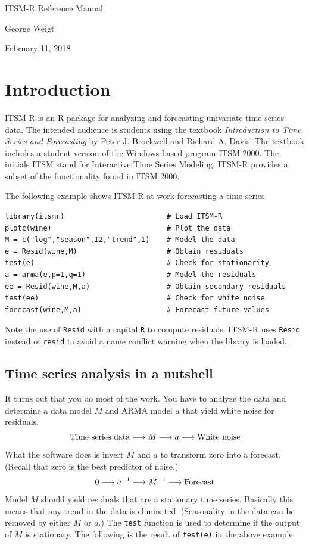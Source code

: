 \documentclass[12pt]{article}
\begin{document}
\begin{center}
{\LARGE ITSM-R Reference Manual}

George Weigt

February 11, 2018
\end{center}

\tableofcontents

\newpage

\section{Introduction}
ITSM-R is an R package for analyzing and forecasting univariate
time series data.
The intended audience is students using the textbook
{\it Introduction to Time Series and Forecasting}
by Peter J. Brockwell and Richard A. Davis.
The textbook includes a student version of the Windows-based program ITSM 2000.
The initials ITSM stand for Interactive Time Series Modeling.
ITSM-R provides a subset of the functionality found in ITSM 2000.

The following example shows ITSM-R at work forecasting a time series.

\begin{verbatim}
library(itsmr)                        # Load ITSM-R
plotc(wine)                           # Plot the data
M = c("log","season",12,"trend",1)    # Model the data
e = Resid(wine,M)                     # Obtain residuals
test(e)                               # Check for stationarity
a = arma(e,p=1,q=1)                   # Model the residuals
ee = Resid(wine,M,a)                  # Obtain secondary residuals
test(ee)                              # Check for white noise
forecast(wine,M,a)                    # Forecast future values
\end{verbatim}

Note the use of {\tt Resid} with a capital {\tt R} to compute residuals.
ITSM-R uses {\tt Resid} instead of {\tt resid} to avoid a name conflict
warning when the library is loaded.

\subsection{Time series analysis in a nutshell}
It turns out that you do most of the work.
You have to analyze the data and
determine a data model $M$ and ARMA model $a$
that yield white noise for residuals.
\[
\hbox{Time series data}
\longrightarrow M\longrightarrow a\longrightarrow
\hbox{White noise}
\]
What the software does is invert $M$ and $a$ to transform zero into a forecast.
(Recall that zero is the best predictor of noise.)
\[
0\longrightarrow a^{-1}\longrightarrow M^{-1}\longrightarrow{\rm Forecast}
\]
Model $M$ should yield residuals that are a stationary time series.
Basically this means that any trend in the data is eliminated.
(Seasonality in the data can be removed by either $M$ or $a$.)
The {\tt test} function is used to determine if the output of $M$ is stationary.
The following is the result of {\tt test(e)} in the above example.
\end{document}
